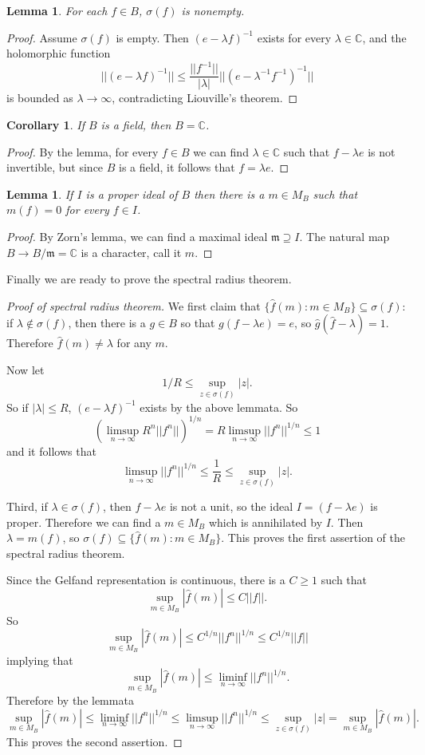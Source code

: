\documentclass[12pt]{report}
\newcommand{\CC}{\mathbb{C}}
\newtheorem{lemma}[theorem]{Lemma}
\newtheorem{corollary}[theorem]{Corollary}
\theoremstyle{definition}
\begin{document}
\begin{lemma}
    For each $f \in B$, $\sigma(f)$ is nonempty.
\end{lemma}
\begin{proof}
    Assume $\sigma(f)$ is empty. Then $(e - \lambda f)^{-1}$ exists for every $\lambda \in \CC$, and the holomorphic function
    $$||(e - \lambda f)^{-1}|| \leq \frac{||f^{-1}||}{|\lambda|}||(e - \lambda^{-1}f^{-1})^{-1}||$$
    is bounded as $\lambda\to \infty$, contradicting Liouville's theorem.
\end{proof}
\begin{corollary}
    If $B$ is a field, then $B = \CC$.
\end{corollary}
\begin{proof}
    By the lemma, for every $f \in B$ we can find $\lambda \in \CC$ such that $f - \lambda e$ is not invertible, but since $B$ is a field, it follows that $f = \lambda e$.
\end{proof}
\begin{lemma}
    If $I$ is a proper ideal of $B$ then there is a $m \in M_B$ such that $m(f) = 0$ for every $f \in I$.
\end{lemma}
\begin{proof}
    By Zorn's lemma, we can find a maximal ideal $\mathfrak m \supseteq I$. The natural map $B \to B/\mathfrak m = \CC$ is a character, call it $m$.
\end{proof}
    Finally we are ready to prove the spectral radius theorem.
\begin{proof}[Proof of spectral radius theorem]
    We first claim that $\{\hat f(m): m \in M_B\} \subseteq \sigma(f)$: if $\lambda \notin \sigma(f)$, then there is a $g \in B$ so that $g(f - \lambda e) = e$, so $\hat g(\hat f - \lambda) = 1$. Therefore $\hat f(m) \neq \lambda$ for any $m$.
    
    Now let
    $$1/R \leq \sup_{z \in \sigma(f)} |z|.$$
    So if $|\lambda| \leq R$, $(e-\lambda f)^{-1}$ exists by the above lemmata. So
    $$\left(\limsup_{n \to \infty} R^n||f^n||\right)^{1/n} =  R\limsup_{n \to \infty}||f^n||^{1/n} \leq 1$$
    and it follows that
    $$\limsup_{n \to \infty} ||f^n||^{1/n} \leq \frac{1}{R} \leq \sup_{z \in \sigma(f)} |z|.$$
    
    Third, if $\lambda \in \sigma(f)$, then $f - \lambda e$ is not a unit, so the ideal $I = (f - \lambda e)$ is proper. Therefore we can find a $m \in M_B$ which is annihilated by $I$. Then $\lambda = m(f)$, so $\sigma(f) \subseteq \{\hat f(m): m \in M_B\}$. This proves the first assertion of the spectral radius theorem.
    
    Since the Gelfand representation is continuous, there is a $C \geq 1$ such that
    $$\sup_{m \in M_B} |\hat f(m)| \leq C||f||.$$
    So
    $$\sup_{m \in M_B} |\hat f(m)| \leq C^{1/n} ||f^n||^{1/n} \leq C^{1/n}||f||$$
    implying that
    $$\sup_{m \in M_B} |\hat f(m)| \leq \liminf_{n \to \infty} ||f^n||^{1/n}.$$
    Therefore by the lemmata
    $$\sup_{m \in M_B} |\hat f(m)| \leq \liminf_{n \to \infty} ||f^n||^{1/n} \leq \limsup_{n \to \infty} ||f^n||^{1/n} \leq \sup_{z \in \sigma(f)} |z| = \sup_{m \in M_B} |\hat f(m)|.$$
    This proves the second assertion.
\end{proof}
\end{document}
